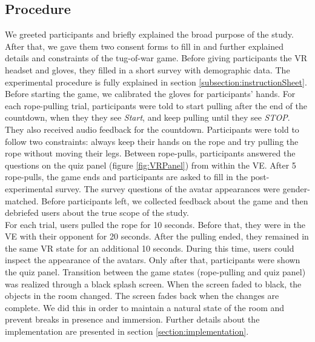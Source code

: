 \subsection{Procedure}
We greeted participants and briefly explained the broad purpose of the study. After that, we gave them two consent forms to fill in and further explained details and constraints of the tug-of-war game. Before giving participants the VR headset and gloves, they filled in a short survey with demographic data. The experimental procedure is fully explained in section \ref{subsection:instructionSheet}.
\\
Before starting the game, we calibrated the gloves for participants' hands. For each rope-pulling trial, participants were told to start pulling after the end of the countdown, when they they see \textit{Start}, and keep pulling until they see \textit{STOP}. They also received audio feedback for the countdown. Participants were told to follow two constraints: always keep their hands on the rope and try pulling the rope without moving their legs. Between rope-pulls, participants answered the questions on the quiz panel (figure \ref{fig:VRPanel}) from within the VE. After 5 rope-pulls, the game ends and participants are asked to fill in the post-experimental survey. The survey questions of the avatar appearances were gender-matched. Before participants left, we collected feedback about the game and then debriefed users about the true scope of the study.\\
For each trial, users pulled the rope for 10 seconds. Before that, they were in the VE with their opponent for 20 seconds. After the pulling ended, they remained in the same VR state for an additional 10 seconds. During this time, users could inspect the appearance of the avatars. Only after that, participants were shown the quiz panel. Transition between the game states (rope-pulling and quiz panel) was realized through a black splash screen. When the screen faded to black, the objects in the room changed. The screen fades back when the changes are complete. We did this in order to maintain a natural state of the room and prevent breaks in presence and immersion. Further details about the implementation are presented in section \ref{section:implementation}.\\
